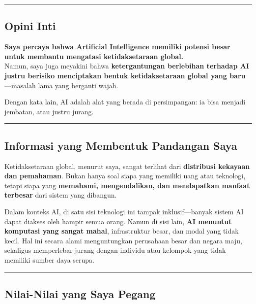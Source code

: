 \documentclass[
  letterpaper,
  DIV=11,
  numbers=noendperiod]{scrreprt}
\begin{document}
\begin{center}\rule{0.5\linewidth}{0.5pt}\end{center}

\subsection{Opini Inti}\label{opini-inti}

\textbf{Saya percaya bahwa Artificial Intelligence memiliki potensi
besar untuk membantu mengatasi ketidaksetaraan global.}\\
Namun, saya juga meyakini bahwa \textbf{ketergantungan berlebihan
terhadap AI justru berisiko menciptakan bentuk ketidaksetaraan global
yang baru}---masalah lama yang berganti wajah.

Dengan kata lain, AI adalah alat yang berada di persimpangan: ia bisa
menjadi jembatan, atau justru jurang.

\begin{center}\rule{0.5\linewidth}{0.5pt}\end{center}

\subsection{Informasi yang Membentuk Pandangan
Saya}\label{informasi-yang-membentuk-pandangan-saya}

Ketidaksetaraan global, menurut saya, sangat terlihat dari
\textbf{distribusi kekayaan dan pemahaman}. Bukan hanya soal siapa yang
memiliki uang atau teknologi, tetapi siapa yang \textbf{memahami,
mengendalikan, dan mendapatkan manfaat terbesar} dari sistem yang
dibangun.

Dalam konteks AI, di satu sisi teknologi ini tampak inklusif---banyak
sistem AI dapat diakses oleh hampir semua orang. Namun di sisi lain,
\textbf{AI menuntut komputasi yang sangat mahal}, infrastruktur besar,
dan modal yang tidak kecil. Hal ini secara alami menguntungkan
perusahaan besar dan negara maju, sekaligus memperlebar jurang dengan
individu atau kelompok yang tidak memiliki sumber daya serupa.

\begin{center}\rule{0.5\linewidth}{0.5pt}\end{center}

\subsection{Nilai-Nilai yang Saya
Pegang}\label{nilai-nilai-yang-saya-pegang}
\end{document}

